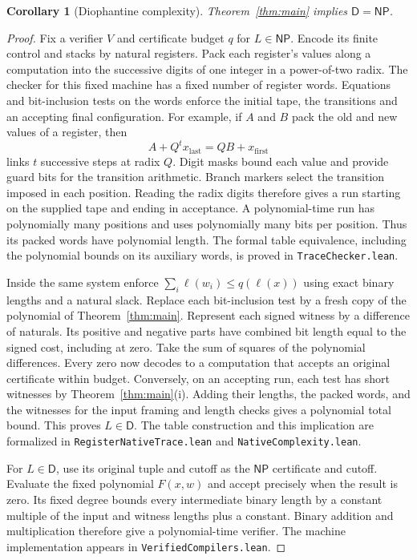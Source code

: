 \documentclass[11pt,letterpaper]{article}
\newtheorem{corollary}[theorem]{Corollary}
\numberwithin{equation}{section}
\newcommand{\DD}{\mathsf D}
\newcommand{\NP}{\mathsf{NP}}
\begin{document}
\begin{corollary}[Diophantine complexity]\label{cor:classes}
Theorem~\ref{thm:main} implies $\DD=\NP$.
\end{corollary}
\begin{proof}
Fix a verifier $V$ and certificate budget $q$ for $L\in\NP$. Encode its finite control and stacks by natural registers. Pack each register's values along a computation into the successive digits of one integer in a power-of-two radix. The checker for this fixed machine has a fixed number of register words. Equations and bit-inclusion tests on the words enforce the initial tape, the transitions and an accepting final configuration. For example, if $A$ and $B$ pack the old and new values of a register, then
\[
            A+Q^t x_{\mathrm{last}}=QB+x_{\mathrm{first}}
\]
links $t$ successive steps at radix $Q$. Digit masks bound each value and provide guard bits for the transition arithmetic. Branch markers select the transition imposed in each position. Reading the radix digits therefore gives a run starting on the supplied tape and ending in acceptance. A polynomial-time run has polynomially many positions and uses polynomially many bits per position. Thus its packed words have polynomial length. The formal table equivalence, including the polynomial bounds on its auxiliary words, is proved in \texttt{TraceChecker.lean}.

Inside the same system enforce $\sum_i\ell(w_i)\le q(\ell(x))$ using exact binary lengths and a natural slack. Replace each bit-inclusion test by a fresh copy of the polynomial of Theorem~\ref{thm:main}. Represent each signed witness by a difference of naturals. Its positive and negative parts have combined bit length equal to the signed cost, including at zero. Take the sum of squares of the polynomial differences. Every zero now decodes to a computation that accepts an original certificate within budget. Conversely, on an accepting run, each test has short witnesses by Theorem~\ref{thm:main}(i). Adding their lengths, the packed words, and the witnesses for the input framing and length checks gives a polynomial total bound. This proves $L\in\DD$. The table construction and this implication are formalized in \texttt{RegisterNativeTrace.lean} and \texttt{NativeComplexity.lean}.

For $L\in\DD$, use its original tuple and cutoff as the $\NP$ certificate and cutoff. Evaluate the fixed polynomial $F(x,w)$ and accept precisely when the result is zero. Its fixed degree bounds every intermediate binary length by a constant multiple of the input and witness lengths plus a constant. Binary addition and multiplication therefore give a polynomial-time verifier. The machine implementation appears in \texttt{VerifiedCompilers.lean}.
\end{proof}
\end{document}
